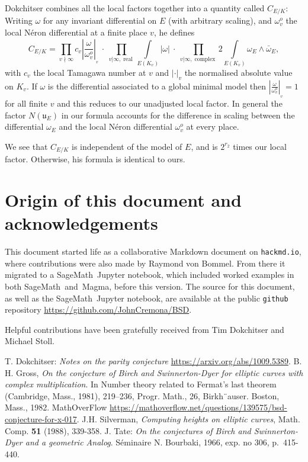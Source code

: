 \documentclass{amsart}
\newcommand{\software}[1]{\textsf{#1}} %
\newcommand{\Sage}{\software{SageMath}}
\newcommand{\Magma}{\software{Magma}{}}
\DeclareMathOperator{\real}{real}
\DeclareMathOperator{\complex}{complex}
\begin{document}
Dokchitser combines all the local factors together into a quantity called
\(C_{E/K}\): Writing \(\omega\) for any invariant differential on \(E\)
(with arbitrary scaling), and \(\omega_v^o\) the local N\'eron
differential at a finite place \(v\), he defines \[
  C_{E/K} = \prod_{v\nmid\infty} c_v \left\vert\frac{\omega}{\omega_v^o}\right\vert_{_v}
    \>\cdot\>\prod_{{v|\infty},{\real}} \int\limits_{E(K_v)}\!\! |\omega|
    \>\cdot\>\prod_{{v|\infty},{\complex}} 2\!\!\!\int\limits_{E(K_v)}\!\! \omega_E\wedge \bar\omega_E,
\] with \(c_v\) the local Tamagawa number at \(v\) and \(|\cdot|_v\) the
normalised absolute value on \(K_v\). If \(\omega\) is the differential
associated to a global minimal model then
\(\left\vert\frac{\omega}{\omega_v^o}\right\vert_{_v}=1\) for all finite
\(v\) and this reduces to our unadjusted local factor. In general the
factor \(N(\mathfrak{u}_E)\) in our formula accounts for the difference in
scaling between the differential \(\omega_E\) and the local N\'eron
differential \(\omega_v^o\) at every place.

We see that \(C_{E/K}\) is independent of the model of \(E\), and is
$2^{r_2}$ times our local factor.  Otherwise, his formula is identical
to ours.

\section{Origin of this document and acknowledgements}
This document started life as a collaborative Markdown document on
{\tt hackmd.io}, where contributions were also made by Raymond von
Bommel.  From there it migrated to a \Sage\ Jupyter notebook, which
included worked examples in both \Sage\ and~\Magma{}, before this
version.  The source for this document, as well as the \Sage\ Jupyter
notebook, are available at the public {\tt github} repository
\url{https://github.com/JohnCremona/BSD}.

Helpful contributions have been gratefully received from Tim
Dokchitser and Michael Stoll.

\begin{thebibliography}{99}
  T. Dokchitser: \textit{Notes on the parity conjecture}
  \url{https://arxiv.org/abs/1009.5389}.
 B. H. Gross, \textit{On the conjecture of Birch and
  Swinnerton-Dyer for elliptic curves with complex multiplication}. In
  Number theory related to Fermat’s last theorem (Cambridge, Mass.,
  1981), 219–236, Progr. Math., 26, Birkh¨auser. Boston, Mass., 1982.
  MathOverFlow\break
  \url{https://mathoverflow.net/questions/139575/bsd-conjecture-for-x-017}.
 J.H. Silverman, \textit{Computing heights on
  elliptic curves}, Math. Comp. {\bf 51} (1988), 339-358.
  J. Tate: \textit{On the conjectures of Birch and Swinnerton-Dyer and a
  geometric Analog}. S\'eminaire N. Bourbaki, 1966, exp. no 306,
  p.~415-440.
\end{thebibliography}
\end{document}
